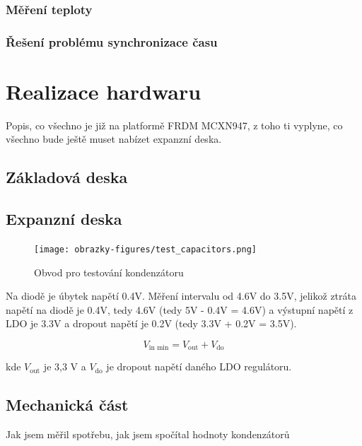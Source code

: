 \subsection{Měření teploty}


\subsection{Řešení problému synchronizace času}


\chapter{Realizace hardwaru}
\label{realizace_hardwaru}
Popis, co všechno je již na platformě FRDM MCXN947, z toho ti vyplyne, co všechno bude ještě muset nabízet expanzní deska.
\section{Základová deska}

\section{Expanzní deska}

\begin{figure}[h]
    \centering
    \texttt{[image: obrazky-figures/test\_capacitors.png]}
    
    \caption{Obvod pro testování kondenzátoru}
    \label{fig:test-capacitors}
\end{figure}

Na diodě je úbytek napětí 0.4V. Měření intervalu od 4.6V do 3.5V, jelikož ztráta napětí na diodě je 0.4V, tedy 4.6V (tedy 5V - 0.4V = 4.6V) a výstupní napětí z LDO je 3.3V a dropout napětí je 0.2V (tedy 3.3V + 0.2V = 3.5V).

\[
V_{\text{in min}} = V_{\text{out}} + V_{\text{do}}
\]

kde \(V_{\text{out}}\) je 3,3 V a \(V_{\text{do}}\) je dropout napětí daného LDO regulátoru.


\section{Mechanická část}
Jak jsem měřil spotřebu, jak jsem spočítal hodnoty kondenzátorů

